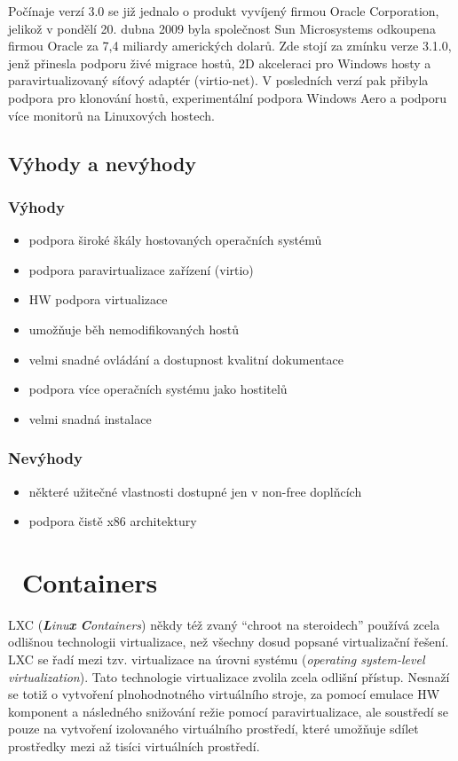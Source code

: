 Počínaje verzí 3.0 se již jednalo o produkt vyvíjený firmou Oracle Corporation, jelikož v pondělí 20. dubna 2009 byla společnost Sun Microsystems odkoupena firmou Oracle za 7,4 miliardy amerických dolarů. Zde stojí za zmínku verze 3.1.0, jenž přinesla podporu živé migrace hostů, 2D akceleraci pro Windows hosty a paravirtualizovaný síťový adaptér (virtio-net). V posledních verzí pak přibyla podpora pro klonování hostů, experimentální podpora Windows Aero a podporu více monitorů na Linuxových hostech.

\subsection{Výhody a nevýhody}
\subsubsection{Výhody}
\begin{itemize}
  \item podpora široké škály hostovaných operačních systémů 
  \item podpora paravirtualizace zařízení (virtio)
  \item HW podpora virtualizace
  \item umožňuje běh nemodifikovaných hostů
  \item velmi snadné ovládání a dostupnost kvalitní dokumentace
  \item podpora více operačních systému jako hostitelů
  \item velmi snadná instalace
\end{itemize}
\subsubsection{Nevýhody}
\begin{itemize}
  \item některé užitečné vlastnosti dostupné jen v non-free doplňcích
  \item podpora čistě x86 architektury
\end{itemize}
\section{\linux\ Containers}
LXC (\emph{\textbf{L}inu\textbf{x} \textbf{C}ontainers}) někdy též zvaný "`chroot na steroidech"' používá zcela odlišnou technologii virtualizace, než všechny dosud popsané virtualizační řešení. LXC se řadí mezi tzv. virtualizace na úrovni systému (\emph{operating system-level virtualization}). Tato technologie virtualizace zvolila zcela odlišní přístup. Nesnaží se totiž o vytvoření plnohodnotného virtuálního stroje, za pomocí emulace HW komponent a následného snižování režie pomocí paravirtualizace, ale soustředí se pouze na vytvoření izolovaného virtuálního prostředí, které umožňuje sdílet prostředky mezi až tisíci virtuálních prostředí.

